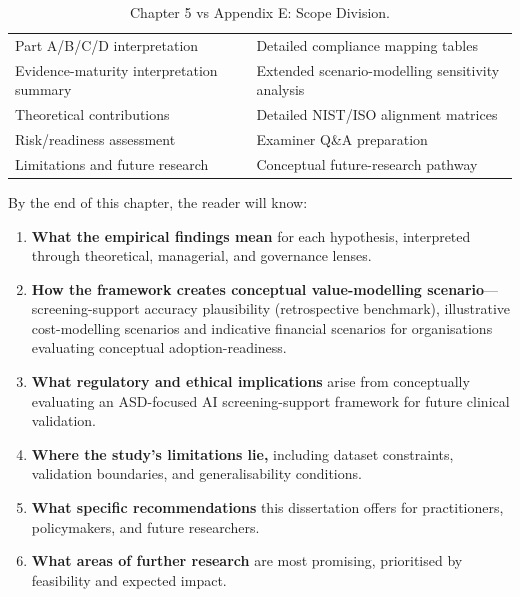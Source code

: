 \begin{table}[H]
\centering
\caption{Chapter 5 vs Appendix E: Scope Division.}
\tablestripes\tablefontsize
\begin{tabularx}{\textwidth}{@{} L L @{}}
\toprule
{} &  \\
\midrule
Part A/B/C/D interpretation & Detailed compliance mapping tables \\
\addlinespace
Evidence-maturity interpretation summary & Extended scenario-modelling sensitivity analysis \\
\addlinespace
Theoretical contributions & Detailed NIST/ISO alignment matrices \\
\addlinespace
Risk/readiness assessment & Examiner Q\&A preparation \\
\addlinespace
Limitations and future research & Conceptual future-research pathway \\
\bottomrule
\end{tabularx}
\end{table}


By the end of this chapter, the reader will know:

\begin{enumerate}[label=(\alph*)]
    \item \textbf{What the empirical findings mean} for each hypothesis, interpreted through theoretical, managerial, and governance lenses.
    \item \textbf{How the framework creates conceptual value-modelling scenario}---screening-support accuracy plausibility (retrospective benchmark), illustrative cost-modelling scenarios and indicative financial scenarios for organisations evaluating conceptual adoption-readiness.
    \item \textbf{What regulatory and ethical implications} arise from conceptually evaluating an ASD-focused AI screening-support framework for future clinical validation.
    \item \textbf{Where the study's limitations lie,} including dataset constraints, validation boundaries, and generalisability conditions.
    \item \textbf{What specific recommendations} this dissertation offers for practitioners, policymakers, and future researchers.
    \item \textbf{What areas of further research} are most promising, prioritised by feasibility and expected impact.
\end{enumerate}

